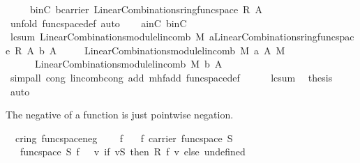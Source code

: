 \begin{isabellebody}
\ \ \ \ \ binC{\isacharcolon}\ {\isachardoublequoteopen}{\isacharquery}b{\isasymin}carrier\ {\isacharparenleft}LinearCombinations{\isachardot}ring{\isachardot}func{\isacharunderscore}space\ R\ A{\isacharparenright}{\isachardoublequoteclose}\ \isamarkupfalse%
\ {\isacharparenleft}unfold\ func{\isacharunderscore}space{\isacharunderscore}def{\isacharcomma}\ auto{\isacharparenright}\isanewline
\ \ \isamarkupfalse%
\ ainC\ binC\ \isamarkupfalse%
\ lc{\isacharunderscore}sum{\isacharcolon}\ {\isachardoublequoteopen}LinearCombinations{\isachardot}module{\isachardot}lincomb\ M\ {\isacharparenleft}{\isacharquery}a{\isasymoplus}\isactrlbsub {\isacharparenleft}LinearCombinations{\isachardot}ring{\isachardot}func{\isacharunderscore}space\ R\ A{\isacharparenright}\isactrlesub \ {\isacharquery}b{\isacharparenright}\ A\isanewline
\ \ \ \ {\isacharequal}\ LinearCombinations{\isachardot}module{\isachardot}lincomb\ M\ {\isacharquery}a\ A\ {\isasymoplus}\isactrlbsub M\isactrlesub \ \isanewline
\ \ \ \ \ \ LinearCombinations{\isachardot}module{\isachardot}lincomb\ M\ {\isacharquery}b\ A{\isachardoublequoteclose}\ \ \isanewline
\ \ \ \ \isamarkupfalse%
\ {\isacharparenleft}simp{\isacharunderscore}all\ cong{\isacharcolon}\ lincomb{\isacharunderscore}cong\ add{\isacharcolon}\ mh{\isachardot}f{\isacharunderscore}add\ func{\isacharunderscore}space{\isacharunderscore}def{\isacharparenright}\isanewline
\ \ \isamarkupfalse%
\ {}\ {}\ lc{\isacharunderscore}sum\ \isamarkupfalse%
\ {\isacharquery}thesis\ \isamarkupfalse%
\ auto\isanewline
{}\isamarkupfalse%
%
\endisatagproof
{\isafoldproof}%
%
\isadelimproof
%
\endisadelimproof
%
\begin{isamarkuptext}%
The negative of a function is just pointwise negation.%
\end{isamarkuptext}%
\isamarkuptrue%
\isamarkupfalse%
\ {\isacharparenleft}\ cring{\isacharparenright}\ func{\isacharunderscore}space{\isacharunderscore}neg{\isacharcolon}\ \isanewline
\ \ \ f\isanewline
\ \ \ {\isachardoublequoteopen}f{\isasymin}\ carrier\ {\isacharparenleft}func{\isacharunderscore}space\ S{\isacharparenright}{\isachardoublequoteclose}\isanewline
\ \ \ {\isachardoublequoteopen}{\isasymominus}\isactrlbsub func{\isacharunderscore}space\ S\isactrlesub \ f\ {\isacharequal}\ {\isacharparenleft}{\isasymlambda}\ v{\isachardot}\ if\ {\isacharparenleft}v{\isasymin}S{\isacharparenright}\ then\ {\isasymominus}\isactrlbsub R\isactrlesub \ f\ v\ else\ undefined{\isacharparenright}{\isachardoublequoteclose}\isanewline

\end{isabellebody}
